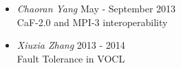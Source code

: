 \begin{itemize}
    \item{\sl Chaoran Yang} \hfill May - September 2013 \\
        CaF-2.0 and MPI-3 interoperability \\
    \item{\sl Xiuxia Zhang} \hfill 2013 - 2014 \\
        Fault Tolerance in VOCL \\
\end{itemize}
